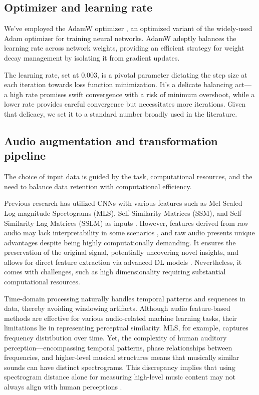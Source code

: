 \subsection{Optimizer and learning rate}

We've employed the AdamW optimizer \cite{Loshchilov2017DecoupledRegularization}, an optimized variant of the widely-used Adam optimizer for training neural networks. AdamW adeptly balances the learning rate across network weights, providing an efficient strategy for weight decay management by isolating it from gradient updates. 

The learning rate, set at 0.003, is a pivotal parameter dictating the step size at each iteration towards loss function minimization. It's a delicate balancing act— a high rate promises swift convergence with a risk of minimum overshoot, while a lower rate provides careful convergence but necessitates more iterations. Given that delicacy, we set it to a standard number broadly used in the literature.

\subsection{Audio augmentation and transformation pipeline}

The choice of input data is guided by the task, computational resources, and the need to balance data retention with computational efficiency.

Previous research has utilized CNNs with various features such as Mel-Scaled Log-magnitude Spectograms (MLS), Self-Similarity Matrices (SSM), and Self-Similarity Lag Matrices (SSLM) as inputs \cite{Hernandez-Olivan2021MusicFeatures}. However, features derived from raw audio may lack interpretability in some scenarios \cite{Schindler2020DeepTutorial}, and raw audio presents unique advantages despite being highly computationally demanding. It ensures the preservation of the original signal, potentially uncovering novel insights, and allows for direct feature extraction via advanced DL models \cite{learning, verydeep}. Nevertheless, it comes with challenges, such as high dimensionality requiring substantial computational resources. 

Time-domain processing naturally handles temporal patterns and sequences in data, thereby avoiding windowing artifacts. Although audio feature-based methods are effective for various audio-related machine learning tasks, their limitations lie in representing perceptual similarity. MLS, for example, captures frequency distribution over time. Yet, the complexity of human auditory perception—encompassing temporal patterns, phase relationships between frequencies, and higher-level musical structures means that musically similar sounds can have distinct spectrograms. This discrepancy implies that using spectrogram distance alone for measuring high-level music content may not always align with human perceptions \cite{Kim2020OneStrategies, Mesostructures2023}.

